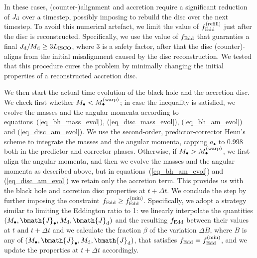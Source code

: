 \documentclass[a4paper,fleqn,usenatbib]{mnras}
\begin{document}
In these cases, (counter-)alignment and accretion require a significant reduction of $J_{\rm d}$ over a timestep, possibly imposing to rebuild the disc over the next timestep.
To avoid this numerical artefact, we limit the value of $f_{\rm Edd}^{\rm (refill)}$ just after the disc is reconstructed.
Specifically, we use the value of $f_{\rm Edd}$ that guaranties a final $J_{\rm d}/M_{\rm d} \geq 3 L_{\rm ISCO}$, where 3 is a safety factor, after that the disc (counter)-aligns from the initial misalignment caused by the disc reconstruction.
We tested that this procedure cures the problem by minimally changing the initial properties of a reconstructed accretion disc.

We then start the actual time evolution of the black hole and the accretion disc.
We check first whether $M_{\bullet} < M_{\bullet}^{\rm (warp)}$; in case the inequality is satisfied, we evolve the masses and the angular momenta according to equations~(\ref{eq_bh_mass_evol}), (\ref{eq_disc_mass_evol}), (\ref{eq_bh_am_evol}) and (\ref{eq_disc_am_evol}).
We use the second-order, predictor-corrector Heun's scheme to integrate the masses and the angular momenta, capping $a_{\bullet}$ to 0.998 both in the predictor and corrector phases.
Otherwise, if $M_{\bullet} > M_{\bullet}^{\rm (warp)}$, we first align the angular momenta, and then we evolve the masses and the angular momenta as described above, but in equations~(\ref{eq_bh_am_evol}) and (\ref{eq_disc_am_evol}) we retain only the accretion term.
This provides us with the black hole and accretion disc properties at $t + \Delta t$.
We conclude the step by further imposing the constraint $f_{\rm Edd} \geq f_{\rm Edd}^{\rm (min)}$.
Specifically, we adopt a strategy similar to limiting the Eddington ratio to 1: we linearly interpolate the quantities $(M_{\bullet}, \bmath{J}_{\bullet}, M_{\rm d}, \bmath{J}_{\rm d})$ and the resulting $f_{\rm Edd}$ between their values at $t$ and $t + \Delta t$ and we calculate the fraction $\beta$ of the variation $\Delta B$, where $B$ is any of $(M_{\bullet}, \bmath{J}_{\bullet}, M_{\rm d}, \bmath{J}_{\rm d})$, that satisfies $f_{\rm Edd} = f_{\rm Edd}^{\rm (min)}$, and we update the properties at $t + \Delta t$ accordingly.
\end{document}
